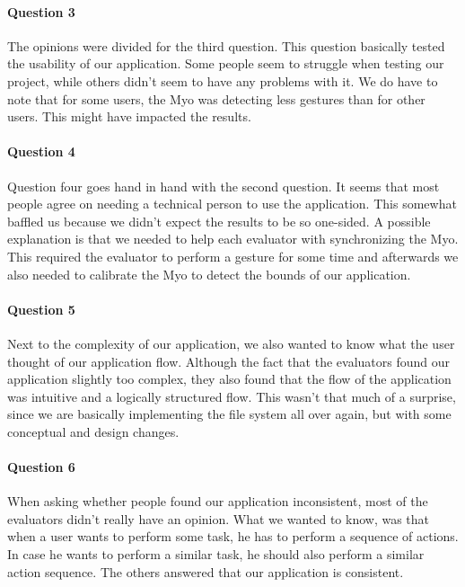 \documentclass{article}
\begin{document}
\paragraph{Question 3}

The opinions were divided for the third question. This question basically tested the usability of our application. Some people seem to struggle when testing our project, while others didn't seem to have any problems with it. We do have to note that for some users, the Myo was detecting less gestures than for other users. This might have impacted the results.

\paragraph{Question 4}

Question four goes hand in hand with the second question. It seems that most people agree on needing a technical person to use the application. This somewhat baffled us because we didn't expect the results to be so one-sided. A possible explanation is that we needed to help each evaluator with synchronizing the Myo. This required the evaluator to perform a gesture for some time and afterwards we also needed to calibrate the Myo to detect the bounds of our application.

\paragraph{Question 5}

Next to the complexity of our application, we also wanted to know what the user thought of our application flow. Although the fact that the evaluators found our application slightly too complex, they also found that the flow of the application was intuitive and a logically structured flow. This wasn't that much of a surprise, since we are basically implementing the file system all over again, but with some conceptual and design changes.

\paragraph{Question 6}

When asking whether people found our application inconsistent, most of the evaluators didn't really have an opinion. What we wanted to know, was that when a user wants to perform some task, he has to perform a sequence of actions. In case he wants to perform a similar task, he should also perform a similar action sequence. The others answered that our application is consistent.
\end{document}
